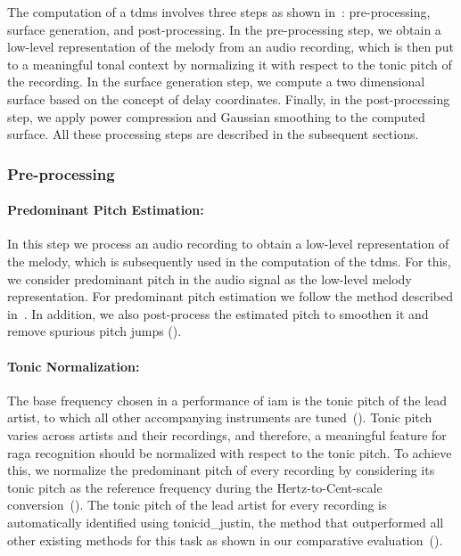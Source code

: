 The computation of a \gls{tdms} involves three steps as shown in~: pre-processing, surface generation, and post-processing. In the pre-processing step, we obtain a low-level representation of the melody from an audio recording, which is then put to a meaningful tonal context by normalizing it with respect to the tonic pitch of the recording. In the surface generation step, we compute a two dimensional surface based on the concept of delay coordinates. Finally, in the post-processing step, we apply power compression and Gaussian smoothing to the computed surface. All these processing steps are described in the subsequent sections.

\subsubsection{Pre-processing} 
\label{sec:tdms_preprocessing}

\paragraph{Predominant Pitch Estimation:} In this step we process an audio recording to obtain a low-level representation of the melody, which is subsequently used in the computation of the \gls{tdms}. For this, we consider predominant pitch in the audio signal as the low-level melody representation. For predominant pitch estimation we follow the method described in~. In addition, we also post-process the estimated pitch to smoothen it and remove spurious pitch jumps (). 

\paragraph{Tonic Normalization:} The base frequency chosen in a performance of \gls{iam} is the tonic pitch of the lead artist, to which all other accompanying instruments are tuned~(). 
Tonic pitch varies across artists and their recordings, and therefore, a meaningful feature for \gls{raga} recognition should be normalized with respect to the tonic pitch. To achieve this, we normalize the predominant pitch of every recording by considering its tonic pitch as the reference frequency during the Hertz-to-Cent-scale conversion~(). The tonic pitch of the lead artist for every recording is automatically identified using \acrshort{tonicid_justin}, the method that outperformed all other existing methods for this task as shown in our comparative evaluation~(). 

